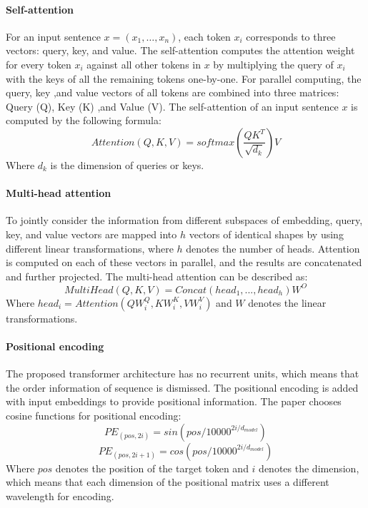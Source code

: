 \paragraph*{Self-attention} For an input sentence $x = (x_1, \ldots, x_n)$, each token $x_i$ corresponds to three vectors: query, key, and value. The self-attention computes the attention weight for every token $x_i$ against all other tokens in $x$ by multiplying the query of $x_i$ with the keys of all the remaining tokens one-by-one. For parallel computing, the query, key ,and value vectors of all tokens are combined into three matrices: Query (Q), Key (K) ,and Value (V). The self-attention of an input sentence $x$ is computed by the following formula: 
\begin{equation}
Attention(Q, K, V) = softmax(\frac{QK^T}{\sqrt{d_k}})V
\end{equation}
Where $d_k$ is the dimension of queries or keys. 
\paragraph*{Multi-head attention} To jointly consider the information from different subspaces of embedding, query, key, and value vectors are mapped into $h$ vectors of identical shapes by using different linear transformations, where $h$ denotes the number of heads. Attention is computed on each of these vectors in parallel, and the results are concatenated and further projected. The multi-head attention can be described as: 
\begin{equation}
MultiHead(Q, K, V) = Concat(head_1, ..., head_h)W^O
\end{equation}
Where $head_i = Attention (QW_i^Q, KW_i^K, VW_i^V)$ and $W$ denotes the linear transformations. 
\paragraph*{Positional encoding} The proposed transformer architecture has no recurrent units, which means that the order information of sequence is dismissed. The positional encoding is added with input embeddings to provide positional information. The paper chooses cosine functions for positional encoding: 
\begin{equation}
PE_{(pos, 2i)} = sin(pos/10000^{2i/d_{model}})
\end{equation}
\begin{equation}
PE_{(pos, 2i+1)} = cos(pos/10000^{2i/d_{model}})
\end{equation}
Where $pos$ denotes the position of the target token and $i$ denotes the dimension, which means that each dimension of the positional matrix uses a different wavelength for encoding. 
